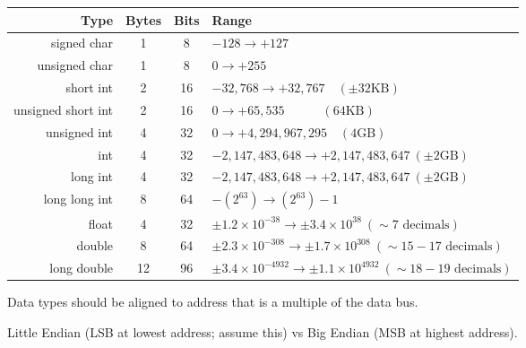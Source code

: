 \begin{table}[H]
    \centering
    \begin{tabular}{r c c l}
        \hline
        \textbf{Type} & \textbf{Bytes} & \textbf{Bits} & \textbf{\quad Range} \\
        \hline
        signed char & 1 & 8 & $-128 \to +127$ \\
        unsigned char & 1 & 8 & $0 \to +255$ \\
        short int & 2 & 16 & $-32,768 \to +32,767 \quad (\pm 32\text{KB})$ \\
        unsigned short int & 2 & 16 & $0 \to +65,535 \quad\qquad (64\text{KB})$ \\
        unsigned int & 4 & 32 & $0 \to +4,294,967,295 \quad (4\text{GB})$ \\
        int & 4 & 32 & $-2,147,483,648 \to +2,147,483,647 \ (\pm 2\text{GB})$ \\
        long int & 4 & 32 & $-2,147,483,648 \to +2,147,483,647 \ (\pm 2\text{GB})$ \\
        long long int & 8 & 64 & $-(2^{63}) \to (2^{63})-1$ \\
        float & 4 & 32 & $\pm1.2\times 10^{-38} \to \pm 3.4\times 10^{38} \ (\sim7 \text{ decimals})$ \\
        double & 8 & 64 & $\pm2.3 \times 10^{-308} \to \pm1.7\times 10^{308} \ (\sim 15-17 \text{ decimals})$ \\
        long double & 12 & 96 & $\pm3.4\times 10^{-4932} \to \pm1.1\times 10^{4932} \ (\sim 18-19 \text{ decimals})$ \\
        \hline
    \end{tabular}
\end{table}

\noindent Data types should be aligned to address that is a multiple of the data bus.

\noindent Little Endian (LSB at lowest address; assume this) vs Big Endian (MSB at highest address).
